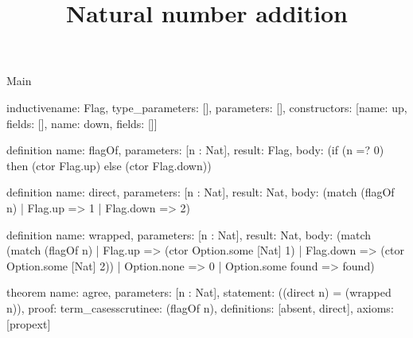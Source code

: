 \begin{lexlean}{Main}
\title{Natural number addition}
\begin{semanticmodule}
inductive{name: Flag, type_parameters: [], parameters: [], constructors: [{name: up, fields: []}, {name: down, fields: []}]}

definition{
  name: flagOf,
  parameters: [n : Nat],
  result: Flag,
  body: (if (n =? 0) then (ctor Flag.up) else (ctor Flag.down))
}

definition{
  name: direct,
  parameters: [n : Nat],
  result: Nat,
  body: (match (flagOf n)
    | Flag.up => 1
    | Flag.down => 2)
}

definition{
  name: wrapped,
  parameters: [n : Nat],
  result: Nat,
  body: (match (match (flagOf n)
    | Flag.up => (ctor Option.some [Nat] 1)
    | Flag.down => (ctor Option.some [Nat] 2))
    | Option.none => 0
    | Option.some found => found)
}

theorem{
  name: agree,
  parameters: [n : Nat],
  statement: ((direct n) = (wrapped n)),
  proof: term_cases{scrutinee: (flagOf n), definitions: [absent, direct]},
  axioms: [propext]
}
\end{semanticmodule}
\end{lexlean}
